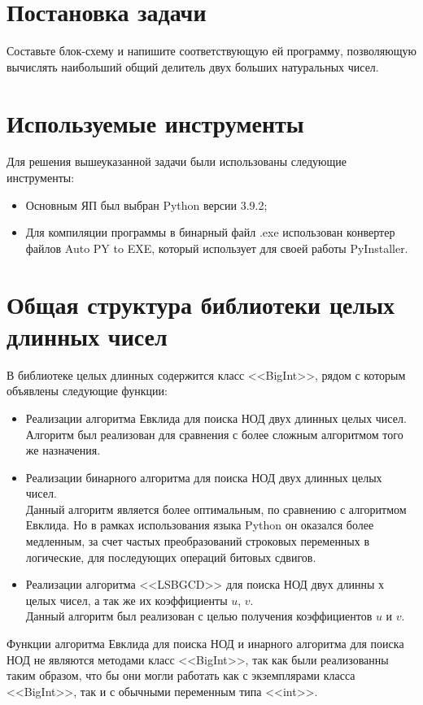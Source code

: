 \section{Постановка задачи}
Составьте блок-схему и напишите соответствующую ей программу, позволяющую
вычислять наибольший общий делитель двух больших натуральных чисел.


\clearpage
\section{Используемые инструменты}
Для решения вышеуказанной задачи были использованы следующие инструменты:
\begin{itemize}
    \item Основным ЯП был выбран Python версии 3.9.2;
    \item Для компиляции программы в бинарный файл .exe использован конвертер файлов Auto PY to EXE,
    который использует для своей работы PyInstaller.
\end{itemize}


\clearpage
\section{Общая структура библиотеки целых\\длинных чисел}
В библиотеке целых длинных содержится класс <<BigInt>>, рядом с которым объявлены следующие функции:
\begin{itemize}
    \item Реализации алгоритма Евклида для поиска НОД двух длинных целых чисел.\\
    Алгоритм был реализован для сравнения с более сложным алгоритмом того же назначения.
    \item Реализации бинарного алгоритма для поиска НОД двух длинных целых чисел.\\
    Данный алгоритм является более оптимальным, по сравнению с алгоритмом Евклида.
    Но в рамках использования языка Python он оказался более медленным, за счет частых преобразований
    строковых переменных в логические, для последующих операций битовых сдвигов.
    \item Реализации алгоритма <<LSBGCD>> для поиска НОД двух длинны х целых чисел, а так же их коэффициенты $u$, $v$.\\
    Данный алгоритм был реализован с целью получения коэффициентов $u$ и $v$.
\end{itemize}
Функции алгоритма Евклида для поиска НОД и инарного алгоритма для поиска НОД не являются методами класс <<BigInt>>,
так как были реализованны таким образом, что бы они могли работать как с экземплярами класса <<BigInt>>,
так и с обычными переменным типа <<int>>.

